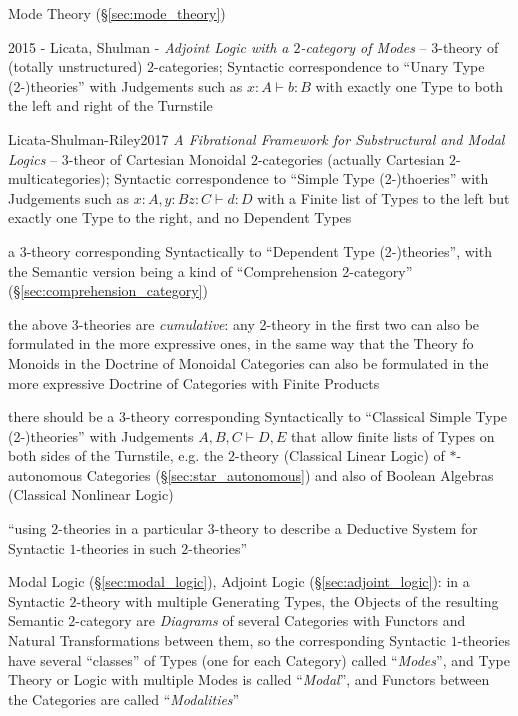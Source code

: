 \fist Mode Theory (\S\ref{sec:mode_theory})

2015 - Licata, Shulman - \emph{Adjoint Logic with a $2$-category of Modes} --
$3$-theory of (totally unstructured) $2$-categories; Syntactic correspondence
to ``Unary Type (2-)theories'' with Judgements such as $x : A \vdash b : B$
with exactly one Type to both the left and right of the Turnstile

Licata-Shulman-Riley2017 \emph{A Fibrational Framework for
  Substructural and Modal Logics}
-- $3$-theor of Cartesian Monoidal $2$-categories (actually Cartesian
$2$-multicategories); Syntactic correspondence to ``Simple Type (2-)thoeries''
with Judgements such as $x : A, y : B z : C \vdash d : D$ with a Finite list of
Types to the left but exactly one Type to the right, and no Dependent Types

a $3$-theory corresponding Syntactically to ``Dependent Type (2-)theories'',
with the Semantic version being a kind of ``Comprehension 2-category''
(\S\ref{sec:comprehension_category})

the above $3$-theories are \emph{cumulative}: any 2-theory in the first two can
also be formulated in the more expressive ones, in the same way that the Theory
fo Monoids in the Doctrine of Monoidal Categories can also be formulated in the
more expressive Doctrine of Categories with Finite Products

there should be a $3$-theory corresponding Syntactically to ``Classical Simple
Type (2-)theories'' with Judgements $A,B,C \vdash D,E$ that allow finite lists
of Types on both sides of the Turnstile, e.g. the $2$-theory (Classical Linear
Logic) of $*$-autonomous Categories (\S\ref{sec:star_autonomous}) and also of
Boolean Algebras (Classical Nonlinear Logic)

``using $2$-theories in a particular $3$-theory to describe a Deductive System
for Syntactic $1$-theories in such $2$-theories''

Modal Logic (\S\ref{sec:modal_logic}), Adjoint Logic
(\S\ref{sec:adjoint_logic}): in a Syntactic $2$-theory with multiple Generating
Types, the Objects of the resulting Semantic $2$-category are \emph{Diagrams}
of several Categories with Functors and Natural Transformations between them,
so the corresponding Syntactic $1$-theories have several ``classes'' of Types
(one for each Category) called ``\emph{Modes}'', and Type Theory or Logic
with multiple Modes is called ``\emph{Modal}'', and Functors between the
Categories are called ``\emph{Modalities}''



